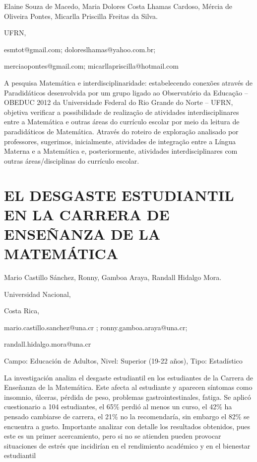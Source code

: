 \begin{datos}

Elaine Souza de Macedo, Maria Dolores Costa Lhamas Cardoso, Mércia
de Oliveira Pontes, Micarlla Priscilla Freitas da Silva.

UFRN, 

esmtot@gmail.com; doloreslhamas@yahoo.com.br;

merciaopontes@gmail.com; micarllapriscilla@hotmail.com

\end{datos}

A pesquisa Matemática e interdisciplinaridade: estabelecendo conexões
através de Paradidáticos desenvolvida por um grupo ligado ao Observatório
da Educação – OBEDUC 2012 da Universidade Federal do Rio Grande do
Norte – UFRN, objetiva verificar a possibilidade de realização de
atividades interdisciplinares entre a Matemática e outras áreas do
currículo escolar por meio da leitura de paradidáticos de Matemática.
Através do roteiro de exploração analisado por professores, sugerimos,
inicialmente, atividades de integração entre a Língua Materna e a
Matemática e, posteriormente, atividades interdisciplinares com outras
áreas/disciplinas do currículo escolar.

\setcounter{section}{151}


\section{EL DESGASTE ESTUDIANTIL EN LA CARRERA DE ENSEÑANZA DE LA MATEMÁTICA}

\begin{datos}

Mario Castillo Sánchez, Ronny, Gamboa Araya, Randall Hidalgo Mora.

Universidad Nacional,

Costa Rica,

mario.castillo.sanchez@una.cr ; ronny.gamboa.araya@una.cr;

randall.hidalgo.mora@una.cr

\end{datos}

Campo: Educación de Adultos, Nivel: Superior (19-22 años), Tipo: Estadístico

La investigación analiza el desgaste estudiantil en los estudiantes
de la Carrera de Enseñanza de la Matemática. Este afecta al estudiante
y aparecen síntomas como insomnio, úlceras, pérdida de peso, problemas
gastrointestinales, fatiga. Se aplicó cuestionario a 104 estudiantes,
el 65\% perdió al menos un curso, el 42\% ha pensado cambiarse de
carrera, el 21\% no la recomendaría, sin embargo el 82\% se encuentra
a gusto. Importante analizar con detalle los resultados obtenidos,
pues este es un primer acercamiento, pero si no se atienden pueden
provocar situaciones de estrés que incidirían en el rendimiento académico
y en el bienestar estudiantil


